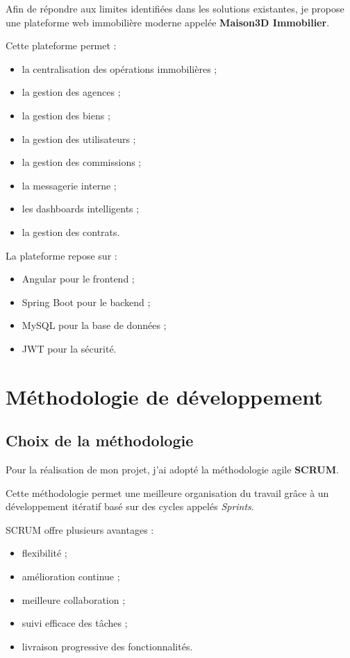 \documentclass[a4paper,12pt]{report}
\begin{document}
Afin de répondre aux limites identifiées dans les solutions existantes, je propose une plateforme web immobilière moderne appelée \textbf{Maison3D Immobilier}.

Cette plateforme permet :

\begin{itemize}
\item la centralisation des opérations immobilières ;
\item la gestion des agences ;
\item la gestion des biens ;
\item la gestion des utilisateurs ;
\item la gestion des commissions ;
\item la messagerie interne ;
\item les dashboards intelligents ;
\item la gestion des contrats.
\end{itemize}

La plateforme repose sur :

\begin{itemize}
\item Angular pour le frontend ;
\item Spring Boot pour le backend ;
\item MySQL pour la base de données ;
\item JWT pour la sécurité.
\end{itemize}


\section{Méthodologie de développement}

\subsection{Choix de la méthodologie}

Pour la réalisation de mon projet, j'ai adopté la méthodologie agile \textbf{SCRUM}.

Cette méthodologie permet une meilleure organisation du travail grâce à un développement itératif basé sur des cycles appelés \textit{Sprints}.

SCRUM offre plusieurs avantages :

\begin{itemize}
\item flexibilité ;
\item amélioration continue ;
\item meilleure collaboration ;
\item suivi efficace des tâches ;
\item livraison progressive des fonctionnalités.
\end{itemize}
\end{document}
